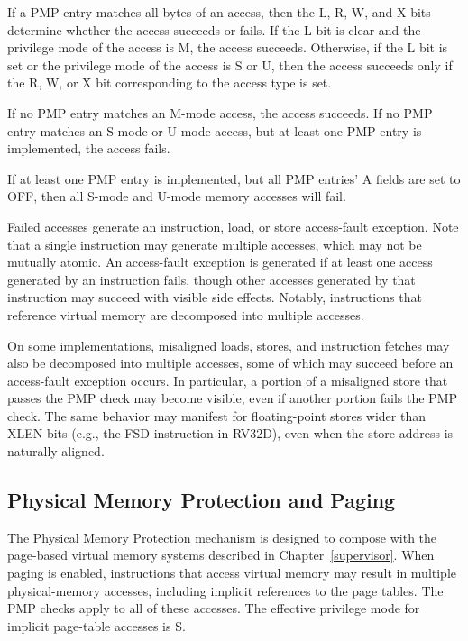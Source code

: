 If a PMP entry matches all bytes of an access, then the L, R, W, and X bits
determine whether the access succeeds or fails.  If the L bit is clear and the
privilege mode of the access is M, the access succeeds.  Otherwise, if the
L bit is set or the privilege mode of the access is S or U, then the access
succeeds only if the R, W, or X bit corresponding to the access type is set.

If no PMP entry matches an M-mode access, the access succeeds.  If no PMP
entry matches an S-mode or U-mode access, but at least one PMP entry is
implemented, the access fails.

\begin{commentary}
If at least one PMP entry is implemented, but all PMP entries' A fields are
set to OFF, then all S-mode and U-mode memory accesses will fail.
\end{commentary}

Failed accesses generate an instruction, load, or store access-fault exception.  Note
that a single instruction may generate multiple accesses, which may not be
mutually atomic.  An access-fault exception is generated if at least one access
generated by an instruction fails, though other accesses generated by that
instruction may succeed with visible side effects.  Notably, instructions that
reference virtual memory are decomposed into multiple accesses.

On some implementations, misaligned loads, stores, and instruction fetches may
also be decomposed into multiple accesses, some of which may succeed before an
access-fault exception occurs.  In particular, a portion of a misaligned store
that passes the PMP check may become visible, even if another portion fails
the PMP check.  The same behavior may manifest for floating-point stores wider
than XLEN bits (e.g., the FSD instruction in RV32D), even when the store
address is naturally aligned.

\subsection{Physical Memory Protection and Paging}
\label{pmp-vmem}

The Physical Memory Protection mechanism is designed to compose with the
page-based virtual memory systems described in Chapter~\ref{supervisor}.  When
paging is enabled, instructions that access virtual memory may result in
multiple physical-memory accesses, including implicit references to the page
tables.  The PMP checks apply to all of these accesses.  The effective
privilege mode for implicit page-table accesses is S.

